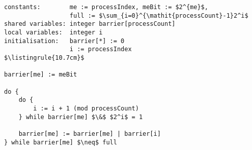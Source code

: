 \begin{center}
\begin{minipage}{\textwidth}
\begin{lstlisting}[mathescape, linewidth=10.7cm]
constants:        me := processIndex, meBit := $2^{me}$,
                  full := $\sum_{i=0}^{\mathit{processCount}-1}2^i$
shared variables: integer barrier[processCount]
local variables:  integer i
initialisation:   barrier[*] := 0
                  i := processIndex
$\listingrule{10.7cm}$

barrier[me] := meBit

do {
	do {
		i := i + 1 (mod processCount)
	} while barrier[me] $\&$ $2^i$ = 1

	barrier[me] := barrier[me] | barrier[i]
} while barrier[me] $\neq$ full
\end{lstlisting}
\end{minipage}
\end{center}
